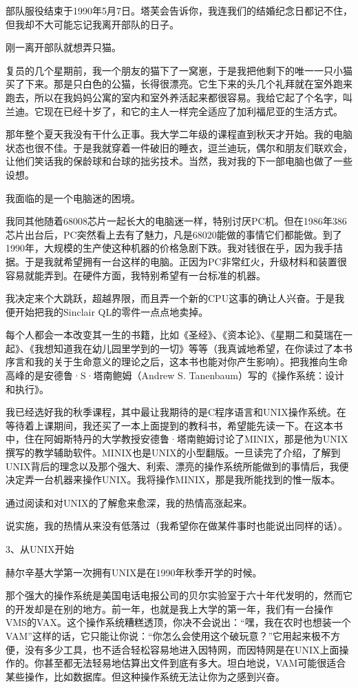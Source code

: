 部队服役结束于1990年5月7日。塔芙会告诉你，我连我们的结婚纪念日都记不住，但我却不大可能忘记我离开部队的日子。

刚一离开部队就想弄只猫。

复员的几个星期前，我一个朋友的猫下了一窝崽，于是我把他剩下的唯一一只小猫买了下来。那是只白色的公猫，长得很漂亮。它生下来的头几个礼拜就在室外跑来跑去，所以在我妈妈公寓的室内和室外养活起来都很容易。我给它起了个名字，叫兰迪。它现在已经十岁了，和它的主人一样完全适应了加利福尼亚的生活方式。

那年整个夏天我没有干什么正事。我大学二年级的课程直到秋天才开始。我的电脑状态也很不佳。于是我就穿着一件破旧的睡衣，逗兰迪玩，偶尔和朋友们联欢会，让他们笑话我的保龄球和台球的拙劣技术。当然，我对我的下一部电脑也做了一些设想。

我面临的是一个电脑迷的困境。

我同其他随着68008芯片一起长大的电脑迷一样，特别讨厌PC机。但在1986年386芯片出台后，PC突然看上去有了魅力，凡是68020能做的事情它们都能做。到了1990年，大规模的生产使这种机器的价格急剧下跌。我对钱很在乎，因为我手拮据。于是我就希望拥有一台这样的电脑。正因为PC非常红火，升级材料和装置很容易就能弄到。在硬件方面，我特别希望有一台标准的机器。

我决定来个大跳跃，超越界限，而且弄一个新的CPU这事的确让人兴奋。于是我便开始把我的Sinclair QL的零件一点点地卖掉。

每个人都会一本改变其一生的书籍，比如《圣经》、《资本论》、《星期二和莫瑞在一起》、《我想知道我在幼儿园里学到的一切》等等（我真诚地希望，在你读过了本书序言和我的关于生命意义的理论之后，这本书也能对你产生影响）。把我推向生命高峰的是安德鲁·S·塔南鲍姆（Andrew S. Tanenbaum）写的《操作系统：设计和执行》。

我已经选好我的秋季课程，其中最让我期待的是C程序语言和UNIX操作系统。在等待着上课期间，我还买了一本上面提到的教科书，希望能先读一下。在这本书中，住在阿姆斯特丹的大学教授安德鲁·塔南鲍姆讨论了MINIX，那是他为UNIX撰写的教学辅助软件。MINIX也是UNIX的小型翻版。一旦读完了介绍，了解到UNIX背后的理念以及那个强大、利索、漂亮的操作系统所能做到的事情后，我便决定弄一台机器来操作UNIX。我将操作MINIX，那是我所能找到的惟一版本。

通过阅读和对UNIX的了解愈来愈深，我的热情高涨起来。

说实施，我的热情从来没有低落过（我希望你在做某件事时也能说出同样的话）。

 
3、从UNIX开始

赫尔辛基大学第一次拥有UNIX是在1990年秋季开学的时候。

那个强大的操作系统是美国电话电报公司的贝尔实验室于六十年代发明的，然而它的开发却是在别的地方。前一年，也就是我上大学的第一年，我们有一台操作VMS的VAX。这个操作系统糟糕透顶，你决不会说出：“嘿，我在农时也想装一个VAM”这样的话，它只能让你说：“你怎么会使用这个破玩意？”它用起来极不方便，没有多少工具，也不适合轻松容易地进入因特网，而因特网是在UNIX上面操作的。你甚至都无法轻易地估算出文件到底有多大。坦白地说，VAM可能很适合某些操作，比如数据库。但这种操作系统无法让你为之感到兴奋。

